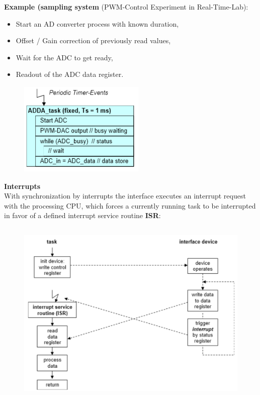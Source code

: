 \textbf{Example (sampling system }(PWM-Control Experiment in Real-Time-Lab): 

\begin{itemize}
	\item  Start an AD converter process with known duration, 
	\item  Offset / Gain correction of previously read values,
	\item  Wait for the ADC to get ready,
	\item  Readout of the ADC data register.
\end{itemize}

 	\begin{figure}[h]
    \centering
    \includegraphics[width=6cm, height=4.5cm]{Images/image125.png}
    \label{fig:Fig 74}
    \end{figure}
\newpage
{\rot\bf Interrupts}\\

With synchronization by interrupts the interface executes an interrupt request with the processing CPU, which forces a currently running task to be interrupted in favor of a defined interrupt service routine \textbf{ISR}:

 	\begin{figure}[h]
    \centering
    \includegraphics[width=14cm, height=9cm]{Images/image126.png}
    \label{fig:Fig 75}
    \end{figure}

